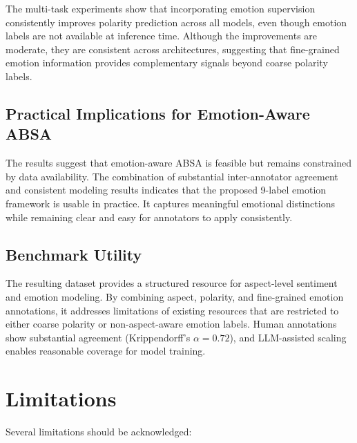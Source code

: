 \documentclass[10pt]{article}
\begin{document}
The multi-task experiments show that incorporating emotion supervision consistently improves polarity prediction across all models, even though emotion labels are not available at inference time. Although the improvements are moderate, they are consistent across architectures, suggesting that fine-grained emotion information provides complementary signals beyond coarse polarity labels.

\subsection{Practical Implications for Emotion-Aware ABSA}

The results suggest that emotion-aware ABSA is feasible but remains constrained by data availability. The combination of substantial inter-annotator agreement and consistent modeling results indicates that the proposed 9-label emotion framework is usable in practice. It captures meaningful emotional distinctions while remaining clear and easy for annotators to apply consistently.

\subsection{Benchmark Utility}

The resulting dataset provides a structured resource for aspect-level sentiment and emotion modeling. By combining aspect, polarity, and fine-grained emotion annotations, it addresses limitations of existing resources that are restricted to either coarse polarity or non-aspect-aware emotion labels. Human annotations show substantial agreement (Krippendorff's $\alpha = 0.72$), and LLM-assisted scaling enables reasonable coverage for model training.

\section{Limitations}

Several limitations should be acknowledged:
\end{document}
